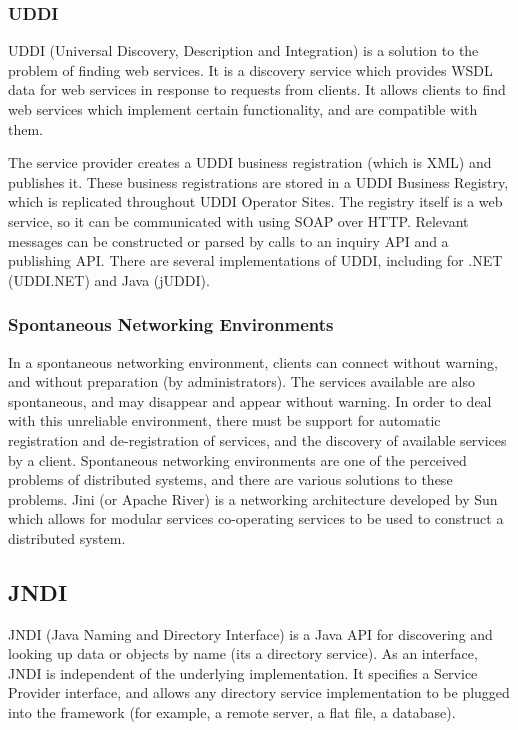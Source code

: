 \documentclass{article}
\begin{document}
\subsubsection{UDDI}
UDDI (Universal Discovery, Description and Integration) is a solution to the problem of finding web services. It is a discovery service which provides WSDL data for web services in response to requests from clients. It allows clients to find web services which implement certain functionality, and are compatible with them. 

The service provider creates a UDDI business registration (which is XML) and publishes it. These business registrations are stored in a UDDI Business Registry, which is replicated throughout UDDI Operator Sites. The registry itself is a web service, so it can be communicated with using SOAP over HTTP. Relevant messages can be constructed or parsed by calls to an inquiry API and a publishing API. There are several implementations of UDDI, including for .NET (UDDI.NET) and Java (jUDDI). 

\subsubsection{Spontaneous Networking Environments}
In a spontaneous networking environment, clients can connect without warning, and without preparation (by administrators). The services available are also spontaneous, and may disappear and appear without warning. In order to deal with this unreliable environment, there must be support for automatic registration and de-registration of services, and the discovery of available services by a client. Spontaneous networking environments are one of the perceived problems of distributed systems, and there are various solutions to these problems. Jini (or Apache River) is a networking architecture developed by Sun which allows for modular services co-operating services to be used to construct a distributed system.

\subsection{JNDI}
JNDI (Java Naming and Directory Interface) is a Java API for discovering and looking up data or objects by name (its a directory service). As an interface, JNDI is independent of the underlying implementation. It specifies a Service Provider interface, and allows any directory service implementation to be plugged into the framework (for example, a remote server, a flat file, a database).
\end{document}
